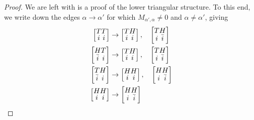 \documentclass[10pt,a4paper]{amsart}
\begin{document}
\begin{proof}
We are left with is a proof of the lower triangular structure. 
To this end, we write down the edges $\alpha\to\alpha'$ for which $M_{\alpha',\alpha}\neq 0$ and $\alpha\neq\alpha'$, giving
\begin{align}
\renewcommand{\arraystretch}{0.7}
\left[
\begin{array}{@{}c@{}c@{}c@{}c@{}}   T&T \\ i&i \end{array}\right]
  &\to
\left[
\begin{array}{@{}c@{}c@{}c@{}c@{}}  T&H \\ i&i \end{array}\right],\quad
\left[
\begin{array}{@{}c@{}c@{}c@{}c@{}} T&H \\ i&\bar i \end{array}\right]
     \\
\left[
\begin{array}{@{}c@{}c@{}c@{}c@{}}  H&T \\ \bar i& i \end{array}\right]
  &\to
\left[
\begin{array}{@{}c@{}c@{}c@{}c@{}} T&H \\ i&i \end{array}\right],\quad
\left[
\begin{array}{@{}c@{}c@{}c@{}c@{}}  T&H \\ i&\bar i \end{array}\right]  
  \\
\left[
\begin{array}{@{}c@{}c@{}c@{}c@{}} T&H \\ \bar i& i \end{array}\right]
  &\to
\left[
\begin{array}{@{}c@{}c@{}c@{}c@{}} H&H \\ i&i \end{array}\right],\quad
\left[
\begin{array}{@{}c@{}c@{}c@{}c@{}} H&H \\ i&\bar i \end{array}\right]  
  \\
\left[
\begin{array}{@{}c@{}c@{}c@{}c@{}}  H&H \\ i& i \end{array}\right]
  &\to
\left[
\begin{array}{@{}c@{}c@{}c@{}c@{}}  H&H \\ i&\bar i \end{array}\right]  

\end{align}
\end{proof}
\end{document}
